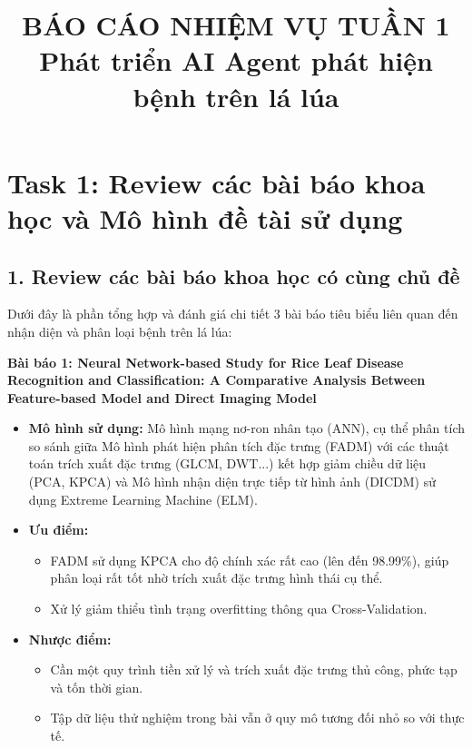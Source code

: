 \documentclass[12pt,a4paper]{article}
\title{\textbf{BÁO CÁO NHIỆM VỤ TUẦN 1}\\ Phát triển AI Agent phát hiện bệnh trên lá lúa}
\author{}
\date{}
\begin{document}
\maketitle

\section{Task 1: Review các bài báo khoa học và Mô hình đề tài sử dụng}

\subsection{1. Review các bài báo khoa học có cùng chủ đề}

Dưới đây là phần tổng hợp và đánh giá chi tiết 3 bài báo tiêu biểu liên quan đến nhận diện và phân loại bệnh trên lá lúa:

\textbf{Bài báo 1: Neural Network-based Study for Rice Leaf Disease Recognition and Classification: A Comparative Analysis Between Feature-based Model and Direct Imaging Model}
\begin{itemize}
    \item \textbf{Mô hình sử dụng:} Mô hình mạng nơ-ron nhân tạo (ANN), cụ thể phân tích so sánh giữa Mô hình phát hiện phân tích đặc trưng (FADM) với các thuật toán trích xuất đặc trưng (GLCM, DWT...) kết hợp giảm chiều dữ liệu (PCA, KPCA) và Mô hình nhận diện trực tiếp từ hình ảnh (DICDM) sử dụng Extreme Learning Machine (ELM).
    \item \textbf{Ưu điểm:} 
    \begin{itemize}
        \item FADM sử dụng KPCA cho độ chính xác rất cao (lên đến 98.99\%), giúp phân loại rất tốt nhờ trích xuất đặc trưng hình thái cụ thể.
        \item Xử lý giảm thiểu tình trạng overfitting thông qua Cross-Validation.
    \end{itemize}
    \item \textbf{Nhược điểm:} 
    \begin{itemize}
        \item Cần một quy trình tiền xử lý và trích xuất đặc trưng thủ công, phức tạp và tốn thời gian.
        \item Tập dữ liệu thử nghiệm trong bài vẫn ở quy mô tương đối nhỏ so với thực tế.
    \end{itemize}
\end{itemize}
\end{document}
